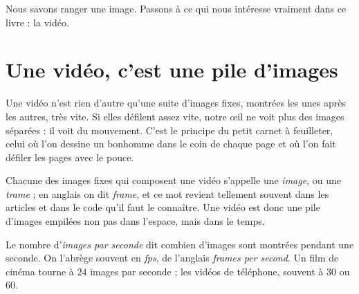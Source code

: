 Nous savons ranger une image. Passons à ce qui nous intéresse vraiment dans
ce livre : la vidéo.

\section{Une vidéo, c'est une pile d'images}

Une vidéo n'est rien d'autre qu'une suite d'images fixes, montrées les unes
après les autres, très vite. Si elles défilent assez vite, notre \oe{}il ne
voit plus des images séparées : il voit du mouvement. C'est le principe du
petit carnet à feuilleter, celui où l'on dessine un bonhomme dans le coin
de chaque page et où l'on fait défiler les pages avec le pouce.

\begin{definition}
Chacune des images fixes qui composent une vidéo s'appelle une
\emph{image}, ou une \emph{trame} ; en anglais on dit \emph{frame}, et ce
mot revient tellement souvent dans les articles et dans le code qu'il faut
le connaître. Une vidéo est donc une pile d'images empilées non pas dans
l'espace, mais dans le temps.
\end{definition}

\begin{definition}
Le nombre d'\emph{images par seconde} dit combien d'images sont montrées
pendant une seconde. On l'abrège souvent en \emph{fps}, de l'anglais
\emph{frames per second}. Un film de cinéma tourne à $24$ images par
seconde ; les vidéos de téléphone, souvent à $30$ ou $60$.
\end{definition}

